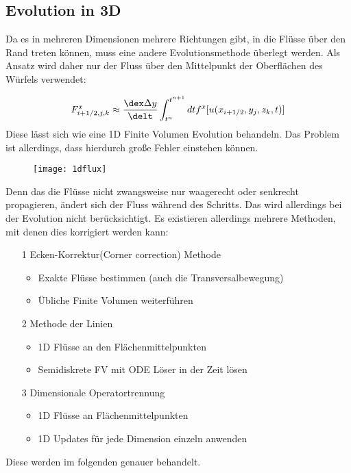 \subsection{Evolution in 3D}
Da es in mehreren Dimensionen mehrere Richtungen gibt, in die Fl\"usse \"uber den Rand treten k\"onnen, muss eine andere Evolutionsmethode \"uberlegt werden. Als Ansatz wird daher nur der Fluss \"uber den Mittelpunkt der Oberfl\"achen des W\"urfels verwendet:
\par
\begin{equation*}
	F^x_{i+1/2,j,k} \approx \frac{\dex\Delta y}{\delt} \int_{t^n}^{t^{n+1}} dt f^x[u(x_{i+1/2},y_j,z_k,t)]
\end{equation*}
Diese l\"asst sich wie eine 1D Finite Volumen Evolution behandeln. Das Problem ist allerdings, dass hierdurch gro\ss{}e Fehler einstehen k\"onnen.
\par
\begin{figure}[ht]
	\centering
	\texttt{[image: 1dflux]}
\end{figure}
Denn das die Fl\"usse nicht zwangsweise nur waagerecht oder senkrecht propagieren, \"andert sich der Fluss w\"ahrend des Schritts. Das wird allerdings bei der Evolution nicht ber\"ucksichtigt. Es existieren allerdings mehrere Methoden, mit denen dies korrigiert werden kann:
\begin{itemize}
	\item[1] Ecken-Korrektur(Corner correction) Methode
	\begin{itemize}
		\item Exakte Fl\"usse bestimmen (auch die Transversalbewegung) 
		\item \"Ubliche Finite Volumen weiterf\"uhren
	\end{itemize}
	\item[2] Methode der Linien 
	\begin{itemize}
		\item 1D Fl\"usse an den Fl\"achenmittelpunkten
		\item Semidiskrete FV mit ODE L\"oser in der Zeit l\"osen
	\end{itemize}
	\item[3] Dimensionale Operatortrennung
	\begin{itemize}
		\item 1D Fl\"usse an Fl\"achenmittelpunkten
		\item 1D Updates f\"ur jede Dimension einzeln anwenden
	\end{itemize}
\end{itemize}
Diese werden im folgenden genauer behandelt.

